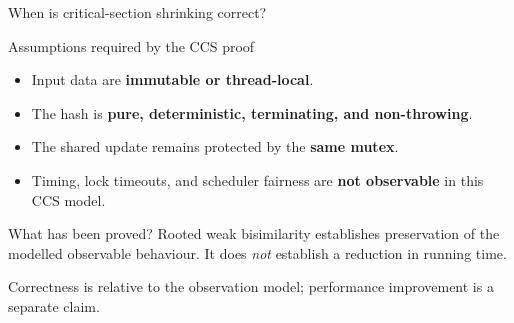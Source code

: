 \documentclass[handout,aspectratio=169,11pt]{beamer}
\newcommand{\Takeaway}[1]{\begin{exampleblock}{}#1\end{exampleblock}}
\begin{document}
\begin{frame}{When is critical-section shrinking correct?}
  \small
  \begin{block}{Assumptions required by the CCS proof}
    \begin{itemize}\setlength\itemsep{3mm}
      \item Input data are \textbf{immutable or thread-local}.
      \item The hash is \textbf{pure, deterministic, terminating,
            and non-throwing}.
      \item The shared update remains protected by the
            \textbf{same mutex}.
      \item Timing, lock timeouts, and scheduler fairness are
            \textbf{not observable} in this CCS model.
    \end{itemize}
  \end{block}
  \begin{exampleblock}{What has been proved?}
    Rooted weak bisimilarity establishes preservation of the
    modelled observable behaviour. It does \emph{not} establish
    a reduction in running time.
  \end{exampleblock}
  \Takeaway{Correctness is relative to the observation model;
    performance improvement is a separate claim.}

\end{frame}
\end{document}
